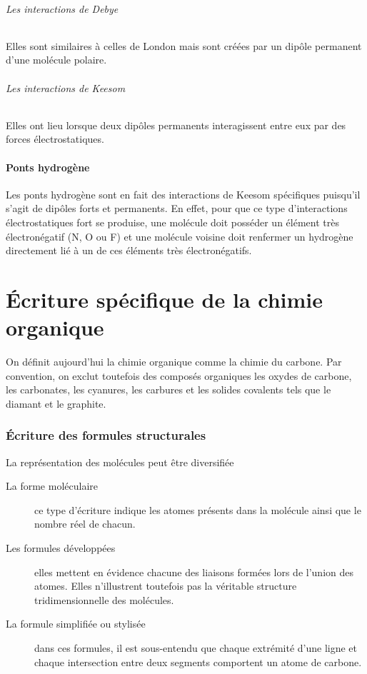 \paragraph{Les interactions de Debye}
Elles sont similaires à celles de London mais sont créées par un dipôle permanent d'une molécule polaire.
\paragraph{Les interactions de Keesom}
Elles ont lieu lorsque deux dipôles permanents interagissent entre eux par des forces électrostatiques.


\subsection{Ponts hydrogène}
Les ponts hydrogène sont en fait des interactions de Keesom spécifiques puisqu'il s'agit de dipôles forts et permanents.
En effet, pour que ce type d'interactions électrostatiques fort se produise, une molécule doit posséder un élément très électronégatif (N, O ou F) et une molécule voisine doit renfermer un hydrogène directement lié à un de ces éléments très électronégatifs.






\part{\'Ecriture spécifique de la chimie organique}
On définit aujourd'hui la chimie organique comme la chimie du carbone.
Par convention, on exclut toutefois des composés organiques les oxydes de carbone, les carbonates, les cyanures, les carbures et les solides covalents tels que le diamant et le graphite.

\section{\'Ecriture des formules structurales}
La représentation des molécules peut être diversifiée
\begin{description}
  \item[La forme moléculaire] ce type d'écriture indique les atomes présents dans la molécule ainsi que le nombre réel de chacun.
  \item[Les formules développées] elles mettent en évidence chacune des liaisons formées lors de l'union des atomes.
    Elles n'illustrent toutefois pas la véritable structure tridimensionnelle des molécules.
  \item[La formule simplifiée ou stylisée] dans ces formules, il est sous-entendu que chaque extrémité d'une ligne et chaque intersection entre deux segments comportent un atome de carbone.
\end{description}

